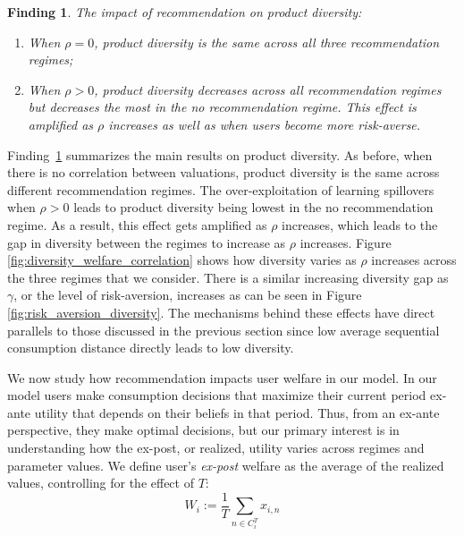 \documentclass[format=acmsmall, review=false]{acmart}
\newtheorem{finding}{Finding}
\begin{document}
\begin{finding}\label{finding_diversity}
The impact of recommendation on product diversity:
\begin{enumerate}
\item When $\rho = 0$, product diversity is the same across all three recommendation regimes;
\item When $\rho > 0$, product diversity decreases across all recommendation regimes but decreases the most in the no recommendation regime. This effect is amplified as $\rho$ increases as well as when users become more risk-averse.
\end{enumerate}
\end{finding}
\par 
Finding~\ref{finding_diversity} summarizes the main results on product diversity. As before, when there is no correlation between valuations, product diversity is the same across different recommendation regimes. The over-exploitation of learning spillovers when $\rho > 0$ leads to product diversity being lowest in the no recommendation regime. As a result, this effect gets amplified as $\rho$ increases, which leads to the gap in diversity between the regimes to increase as $\rho$ increases. Figure \ref{fig:diversity_welfare_correlation} shows how diversity varies as $\rho$ increases across the three regimes that we consider. There is a similar increasing diversity gap as $\gamma$, or the level of risk-aversion, increases as can be seen in Figure \ref{fig:risk_aversion_diversity}. The mechanisms behind these effects have direct parallels to those discussed in the previous section since low average sequential consumption distance directly leads to low diversity.
\par 
We now study how recommendation impacts user welfare in our model. In our model users make consumption decisions that maximize their current period ex-ante utility that depends on their beliefs in that period. Thus, from an ex-ante perspective, they make optimal decisions, but our primary interest is in understanding how the ex-post, or realized, utility varies across regimes and parameter values. We define user's \textit{ex-post} welfare as the average of the realized values, controlling for the effect of $T$:
$$W_i:= \frac{1}{T}\sum_{n \in C_i^T} x_{i,n}$$
\end{document}
